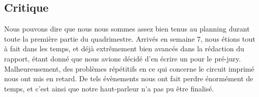 \subsection{Critique} Nous pouvons dire que nous nous sommes assez bien tenus au planning durant toute la 
première partie du quadrimestre. Arrivés en semaine 7, nous étions tout à fait dans les temps, et déjà 
extrêmement bien avancés dans la rédaction du rapport, étant donné que nous avions décidé d'en écrire un 
pour le pré-jury. Malheureusement, des problèmes répétitifs en ce qui concerne le circuit imprimé nous ont
mis en retard. De tels évènements nous ont fait perdre énormément de temps, et c'est ainsi que notre 
haut-parleur n'a pas pu être finalisé.

